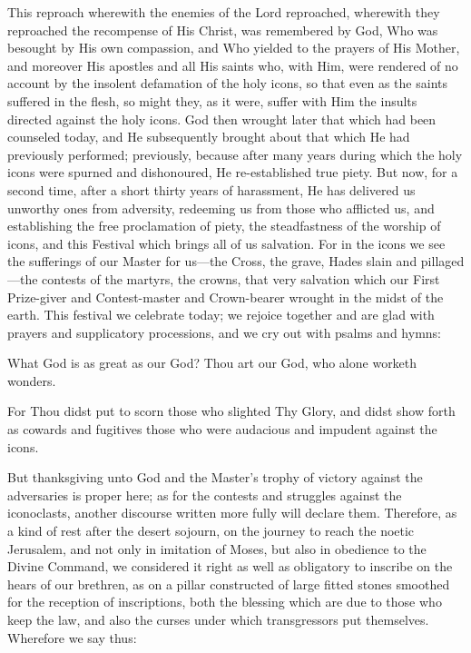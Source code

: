  This reproach wherewith the enemies of the Lord reproached, wherewith they reproached the recompense of His Christ, was remembered by God, Who was besought by His own compassion, and Who yielded to the prayers of His Mother, and moreover His apostles and all His saints who, with Him, were rendered of no account by the insolent defamation of the holy icons, so that even as the saints suffered in the flesh, so might they, as it were, suffer with Him the insults directed against the holy icons. God then wrought later that which had been counseled today, and He subsequently brought about that which He had previously performed; previously, because after many years during which the holy icons were spurned and dishonoured, He re-established true piety. But now, for a second time, after a short thirty years of harassment, He has delivered us unworthy ones from adversity, redeeming us from those who afflicted us, and establishing the free proclamation of piety, the steadfastness of the worship of icons, and this Festival which brings all of us salvation. For in the icons we see the sufferings of our Master for us---the Cross, the grave, Hades slain and pillaged---the contests of the martyrs, the crowns, that very salvation which our First Prize-giver and Contest-master and Crown-bearer wrought in the midst of the earth. This festival we celebrate today; we rejoice together and are glad with prayers and supplicatory processions, and we cry out with psalms and hymns:

What God is as great as our God?  Thou art our God, who alone worketh wonders. 

For Thou didst put to scorn  those who slighted Thy Glory, and didst show forth as cowards and fugitives those who were audacious and impudent against the icons.

But thanksgiving unto God and the Master's trophy of victory against the adversaries is proper here; as for the contests and struggles against the iconoclasts, another discourse written more fully will declare them. Therefore, as a kind of rest after the desert sojourn, on the journey to reach the noetic Jerusalem, and not only in imitation of Moses, but also in obedience to the Divine Command, we considered it right as well as obligatory to inscribe on the hears of our brethren, as on a pillar constructed of large fitted stones smoothed for the reception of inscriptions, both the blessing which are due to those who keep the law, and also the curses under which transgressors put themselves. Wherefore we say thus:

